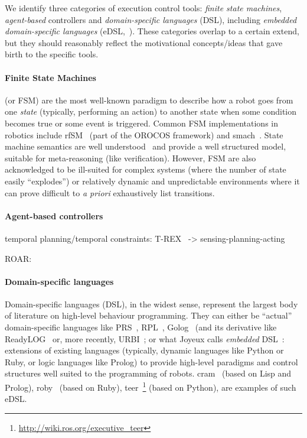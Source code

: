 \documentclass[a4paper, 10pt, conference]{ieeeconf}      %
\begin{document}
We identify three categories of execution control tools: \emph{finite state
machines}, \emph{agent-based} controllers and
\emph{domain-specific languages} (DSL), including \emph{embedded domain-specific
languages} (eDSL,~\cite{joyeux2011robot}). These categories overlap to a certain
extend, but they should reasonably reflect the motivational concepts/ideas that
gave birth to the specific tools.

\paragraph{Finite State Machines} (or FSM) are the most well-known paradigm to
describe how a robot goes from one \emph{state} (typically, performing an
action) to another state when some condition becomes true or some event is
triggered. Common FSM implementations in robotics include {\sc
rfSM}~\cite{klotzbucher2010orocos} (part of the OROCOS framework) and
{\sc smach}~\cite{bohren2010smach}. State machine semantics are well
understood~\cite{harel1996statemate} and provide a well structured model,
suitable for meta-reasoning (like verification). However, FSM are also
acknowledged to be ill-suited for complex systems (where the number of state
easily ``explodes'') or relatively dynamic and unpredictable environments where
it can prove difficult to \textit{a priori} exhaustively list transitions.


\paragraph{Agent-based controllers}

temporal planning/temporal constraints: T-REX~\cite{mcgann2007trex} -> sensing-planning-acting

ROAR: ~\cite{degroote2011roar}

\paragraph{Domain-specific languages}

Domain-specific languages (DSL), in the widest sense, represent the largest body
of literature on high-level behaviour programming. They can either be ``actual''
domain-specific languages like PRS~\cite{ingrand1996prs},
RPL~\cite{mcdermott1993reactive}, Golog~\cite{levesque1997golog} (and its
derivative like {\sc ReadyLOG}~\cite{ferrein2007robot} or, more recently,
URBI~\cite{baillie2005urbi}; or what Joyeux calls \emph{embedded}
DSL~\cite{joyeux2011robot}: extensions of existing languages (typically, dynamic
languages like Python or Ruby, or logic languages like Prolog) to provide
high-level paradigms and control structures well suited to the programming of
robots. {\sc cram}~\cite{beetz2010cram} (based on Lisp and Prolog), {\sc
roby}~\cite{joyeux2009plan} (based on Ruby), {\sc
teer}~\footnote{\url{http://wiki.ros.org/executive_teer}} (based on Python), are
examples of such eDSL.
\end{document}
